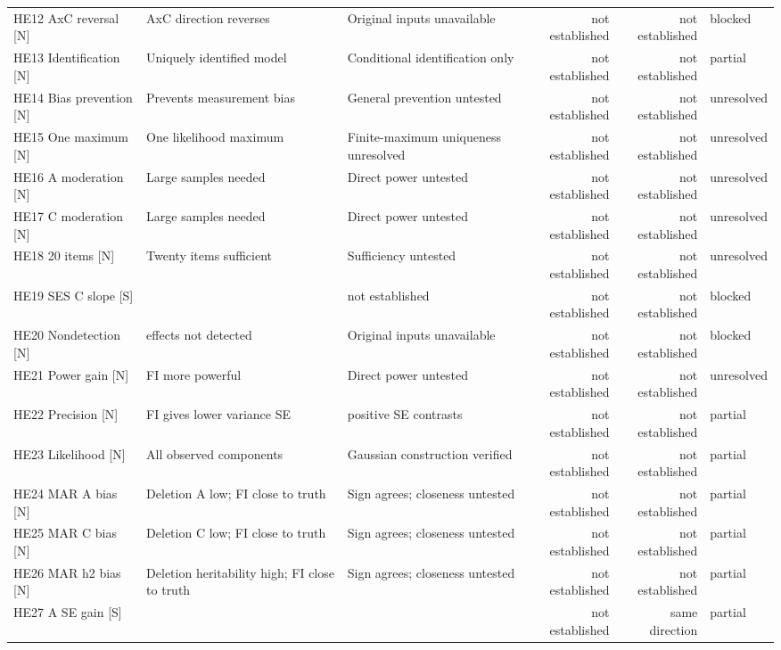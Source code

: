 \documentclass[11pt]{article}
\begin{document}
{\begin{tabular}{@{}>{\raggedright\arraybackslash}p{95pt}>{\raggedright\arraybackslash}p{105pt}>{\raggedright\arraybackslash}p{105pt}rrl@{}}
HE12 AxC reversal [N] & AxC direction reverses & Original inputs unavailable & not established & not established & blocked\\
HE13 Identification [N] & Uniquely identified model & Conditional identification only & not established & not established & partial\\
HE14 Bias prevention [N] & Prevents measurement bias & General prevention untested & not established & not established & unresolved\\
HE15 One maximum [N] & One likelihood maximum & Finite-maximum uniqueness unresolved & not established & not established & unresolved\\
HE16 A moderation [N] & Large samples needed & Direct power untested & not established & not established & unresolved\\
HE17 C moderation [N] & Large samples needed & Direct power untested & not established & not established & unresolved\\
HE18 20 items [N] & Twenty items sufficient & Sufficiency untested & not established & not established & unresolved\\
HE19 SES C slope [S] & -3.0777 & not established & not established & not established & blocked\\
HE20 Nondetection [N] & 13 effects not detected & Original inputs unavailable & not established & not established & blocked\\
HE21 Power gain [N] & FI more powerful & Direct power untested & not established & not established & unresolved\\
HE22 Precision [N] & FI gives lower variance SE & 108 positive SE contrasts & not established & not established & partial\\
HE23 Likelihood [N] & All observed components & Gaussian construction verified & not established & not established & partial\\
HE24 MAR A bias [N] & Deletion A low; FI close to truth & Sign agrees; closeness untested & not established & not established & partial\\
HE25 MAR C bias [N] & Deletion C low; FI close to truth & Sign agrees; closeness untested & not established & not established & partial\\
HE26 MAR h2 bias [N] & Deletion heritability high; FI close to truth & Sign agrees; closeness untested & not established & not established & partial\\
HE27 A SE gain [S] & 0.00106356 & 0.00150235 & not established & same direction & partial\\

\end{tabular}}
\end{document}
